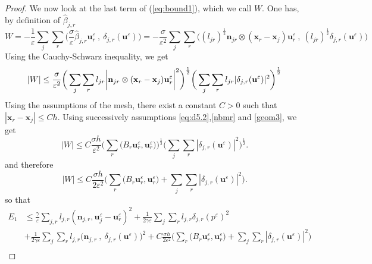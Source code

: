 \documentclass[a4paper,french,english,10pt]{article}
\newcommand\ljr{l_{jr}}
\newcommand\njr{\mathbf{n}_{jr}}
\newcommand\uu{\mathbf{u}}
\newcommand\eps{\varepsilon}
\newcommand\xj{\mathbf{x}_j}
\newcommand\xr{\mathbf{x}_r}
\begin{document}
\begin{proof}
We now look at the last term of (\ref{eq:bound1}), which we call $W$.
One has, by definition of $\widehat{\beta}_{j,r}$
\begin{equation*}
W=-\frac{1}{\eps} \sum_j \sum_r \bigg( \frac{\sigma}{\eps}
\widehat{\beta}_{j,r}\textbf{u}_r^{\eps}\: , \: \delta_{j,r}(\uu^{\eps} )\bigg)
= -\frac{\sigma}{\eps^2} \sum_j \sum_r
\bigg((\ljr)^{\frac12 }\njr\otimes(\xr -\xj)
\textbf{u}_r^{\eps}\: , \: (\ljr)^{\frac12 }\delta_{j,r}(\uu^{\eps})
\bigg)
\end{equation*}
 Using the Cauchy-Schwarz inequality, we get
\begin{equation*}
\vert W \vert \leq \frac{\sigma}{\eps^2} \bigg(\sum_j \sum_r
\ljr  \bigg| 
\njr\otimes(\xr -\xj)
\textbf{u}_r^{\eps}
 \bigg|^2 \bigg)^{\frac12 } \bigg(\sum_j \sum_r
 \ljr  | \delta_{j,r}(\uu^{\eps})| ^2 \bigg)^{\frac12 } \\
\end{equation*}
Using the assumptions of the mesh, there exist a 
constant $C>0$ such that $|\xr -\xj|\leq Ch$.
 Using successively assumptions \eqref{eq:d5.2},\eqref{nbmr} and 
\eqref{geom3}, we get
\begin{equation*}\label{esti_beta}
\vert W \vert
\leq C \frac{\sigma h}{\eps^2}
\bigg( \sum_r \big( B_{r}\textbf{u}_r^{\eps},\textbf{u}_r^{\eps}\big)\bigg)^{\frac12} \bigg(\sum_j \sum_r    | \delta_{j,r}(\uu^{\eps})|^2 \bigg)^{\frac12 }.
\end{equation*}
and therefore
\begin{equation}\label{eq:bound2}
\vert W \vert
\leq C \frac{\sigma h}{2\eps^2}
\bigg( \sum_r \big( B_{r}\textbf{u}_r^{\eps},\textbf{u}_r^{\eps}\big)  +\sum_j \sum_r    | \delta_{j,r}(\uu^{\eps})|^2 \bigg).
\end{equation}
so that
\begin{equation} \label{eq:bound1bis}
\begin{aligned}
E_1 &\leq \frac{\gamma }{\eps}
\sum_{j,r}l_{j,r}(\textbf{n}_{j,r},\textbf{u}_j^{\eps}-\textbf{u}
_r^{\eps})^2 + \frac{1}{2\gamma\eps} \sum_j \sum_r l_{j,r}
\delta_{j,r}(p^{\eps})^2 \\
&+\frac{1}{2 \gamma \eps} \sum_j \sum_r l_{j,r}\bigg( \textbf{n}_{j,r} \: , \:
\delta_{j,r}(\uu^{\eps}) \bigg)^2 + C \frac{\sigma h}{2\eps^2}
\bigg( \sum_r \big( B_{r}\textbf{u}_r^{\eps},\textbf{u}_r^{\eps}\big)  +\sum_j \sum_r    | \delta_{j,r}(\uu^{\eps})|^2 \bigg)\\
\end{aligned}
\end{equation}


\end{proof}
\end{document}
